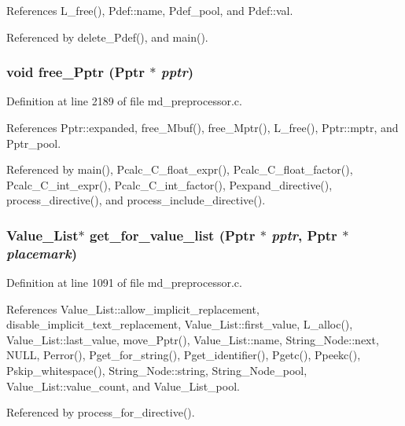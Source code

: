 References L\_\-free(), Pdef::name, Pdef\_\-pool, and Pdef::val.

Referenced by delete\_\-Pdef(), and main().
\subsubsection{\setlength{\rightskip}{0pt plus 5cm}void free\_\-Pptr (\bf{Pptr} $\ast$ {\em pptr})}\label{md__preprocessor_8c_4640aa292e2cee439780e0e2c231b8ed}




Definition at line 2189 of file md\_\-preprocessor.c.

References Pptr::expanded, free\_\-Mbuf(), free\_\-Mptr(), L\_\-free(), Pptr::mptr, and Pptr\_\-pool.

Referenced by main(), Pcalc\_\-C\_\-float\_\-expr(), Pcalc\_\-C\_\-float\_\-factor(), Pcalc\_\-C\_\-int\_\-expr(), Pcalc\_\-C\_\-int\_\-factor(), Pexpand\_\-directive(), process\_\-directive(), and process\_\-include\_\-directive().
\subsubsection{\setlength{\rightskip}{0pt plus 5cm}\bf{Value\_\-List}$\ast$ get\_\-for\_\-value\_\-list (\bf{Pptr} $\ast$ {\em pptr}, \bf{Pptr} $\ast$ {\em placemark})}\label{md__preprocessor_8c_358bcc55e8945163d5b09dd2e3165a4e}




Definition at line 1091 of file md\_\-preprocessor.c.

References Value\_\-List::allow\_\-implicit\_\-replacement, disable\_\-implicit\_\-text\_\-replacement, Value\_\-List::first\_\-value, L\_\-alloc(), Value\_\-List::last\_\-value, move\_\-Pptr(), Value\_\-List::name, String\_\-Node::next, NULL, Perror(), Pget\_\-for\_\-string(), Pget\_\-identifier(), Pgetc(), Ppeekc(), Pskip\_\-whitespace(), String\_\-Node::string, String\_\-Node\_\-pool, Value\_\-List::value\_\-count, and Value\_\-List\_\-pool.

Referenced by process\_\-for\_\-directive().
